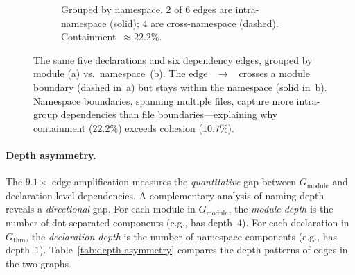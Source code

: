 \begin{figure}[ht]
\begin{subfigure}[b]{0.48\textwidth}
\caption{Grouped by \textcolor{green!50!black}{namespace}. $2$ of $6$ edges are intra-namespace (solid); $4$ are cross-namespace (dashed). Containment~$\approx 22.2\%$.}
\label{fig:ns-vs-mod-namespace-app}
\end{subfigure}
\caption{The same five declarations and six dependency edges, grouped by module (a) vs.\ namespace~(b). The edge ~$\to$~ crosses a \textcolor{blue!60!black}{module boundary} (dashed in~a) but stays within the \textcolor{green!50!black}{} namespace (solid in~b). Namespace boundaries, spanning multiple files, capture more intra-group dependencies than file boundaries---explaining why containment ($22.2\%$) exceeds cohesion ($10.7\%$).}
\label{fig:ns-vs-mod-app}
\end{figure}

\paragraph{Depth asymmetry.}
\label{sec:depth-asymmetry}

\noindent The $9.1\times$ edge amplification measures the \emph{quantitative} gap between $G_{\mathrm{module}}$ and declaration-level dependencies. A complementary analysis of naming depth reveals a \emph{directional} gap. For each module in $G_{\mathrm{module}}$, the \emph{module depth} is the number of dot-separated components (e.g.,  has depth~$4$). For each declaration in $G_{\mathrm{thm}}$, the \emph{declaration depth} is the number of namespace components (e.g.,  has depth~$1$). Table~\ref{tab:depth-asymmetry} compares the depth patterns of edges in the two graphs.

